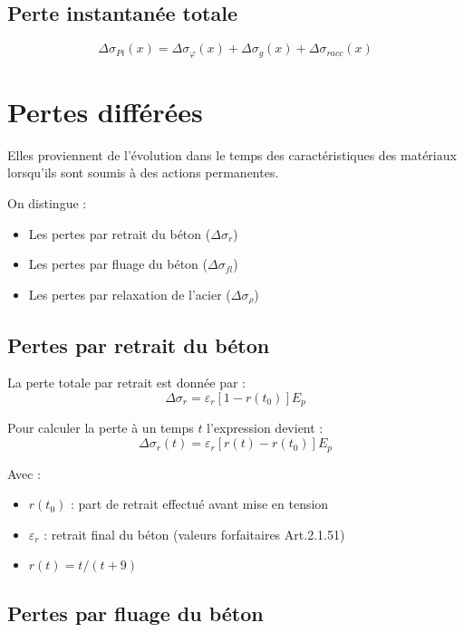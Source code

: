 \documentclass[12pt,a4paper]{article}
\begin{document}
\subsection{Perte instantanée totale}

\begin{equation}
\Delta \sigma_{Pi}(x) = \Delta \sigma_\varphi(x) + \Delta \sigma_g(x) + \Delta \sigma_{racc}(x)
\end{equation}

\section{Pertes différées}

Elles proviennent de l'évolution dans le temps des caractéristiques des matériaux lorsqu'ils sont soumis à des actions permanentes.

On distingue :
\begin{itemize}
    \item Les pertes par retrait du béton ($\Delta \sigma_r$)
    \item Les pertes par fluage du béton ($\Delta \sigma_{fl}$)
    \item Les pertes par relaxation de l'acier ($\Delta \sigma_\rho$)
\end{itemize}

\subsection{Pertes par retrait du béton}

La perte totale par retrait est donnée par :
\begin{equation}
\Delta \sigma_r = \varepsilon_r [1 - r(t_0)] E_p
\end{equation}

Pour calculer la perte à un temps $t$ l'expression devient :
\begin{equation}
\Delta \sigma_r(t) = \varepsilon_r [r(t) - r(t_0)] E_p
\end{equation}

Avec :
\begin{itemize}
    \item $r(t_0)$ : part de retrait effectué avant mise en tension
    \item $\varepsilon_r$ : retrait final du béton (valeurs forfaitaires Art.2.1.51)
    \item $r(t) = t / (t + 9)$
\end{itemize}

\subsection{Pertes par fluage du béton}
\end{document}
